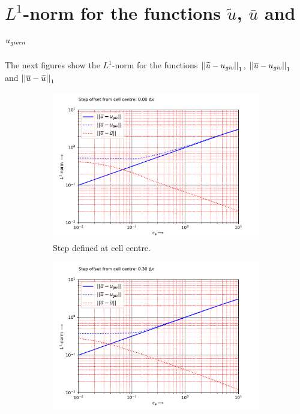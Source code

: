 \section{$L^1$-norm for the functions $\widetilde{u}$, $\overline{u}$ and $u_{\it given}$}
The next figures show the $L^1$-norm for the functions
$\left| |\widetilde{u} - u_{\it giv}| \right|_{1}$,
$\left| |\overline{u}  - u_{\it giv}| \right|_{1}$ and
$\left| |\overline{u}  - \widetilde{u}| \right|_{1}$
\begin{figure}[H]
\begin{subfigure}{0.49\textwidth}
    \includegraphics[width=\textwidth]{figures/regul_1d_step_at=0.0_dx50.0.pdf}
    \caption{Step defined at cell centre.\newline\phantom{text}\label{fig:L1_norm_dx_offset_0.0dx}}
\end{subfigure}
\hfill
\begin{subfigure}{0.49\textwidth}
    \includegraphics[width=\textwidth]{figures/regul_1d_step_at=0.3_dx50.0.pdf}

\end{subfigure}
\end{figure}
